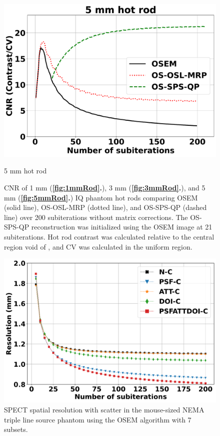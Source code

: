 \documentclass[utf8]{FrontiersinHarvard} %
\begin{document}
\begin{subfigure}
    \setcounter{figure}{2}
	\setcounter{subfigure}{2}
    \begin{minipage}[b]{0.3\textwidth}
        \includegraphics[width=\linewidth]{Figures/SNR_5mmHotRod.pdf}
        \caption{5 mm hot rod}
        \label{fig:5mmRod}
    \end{minipage}
    
\setcounter{figure}{2}
\setcounter{subfigure}{-1}
\caption{CNR of 1 mm (\textbf{\ref{fig:1mmRod}.}), 3 mm (\textbf{\ref{fig:3mmRod}.}), and 5 mm (\textbf{\ref{fig:5mmRod}.}) IQ phantom hot rods comparing OSEM (solid line), OS-OSL-MRP (dotted line), and OS-SPS-QP (dashed line) over 200 subiterations without matrix corrections. The OS-SPS-QP reconstruction was initialized using the OSEM image at 21 subiterations. Hot rod contrast was calculated relative to the central region void of , and CV was calculated in the uniform  region.}\label{fig:CNR}
\end{subfigure}


\begin{figure}[h!]
\setcounter{figure}{2}
\begin{center}
\includegraphics[width=0.5\linewidth]{Figures/Resolution.pdf}
\end{center}
\caption{SPECT spatial resolution with scatter in the mouse-sized NEMA triple line source phantom using the OSEM algorithm with 7 subsets.}\label{fig:resolution}
\end{figure}
\end{document}
